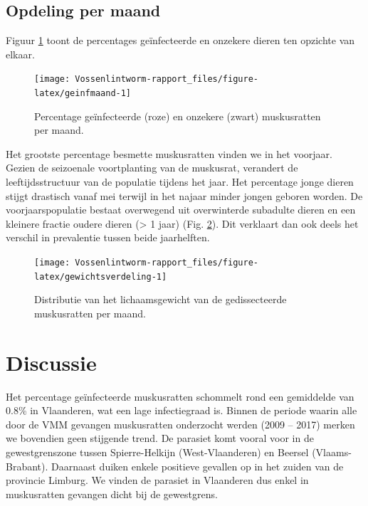 \documentclass[twoside]{extreport}
\begin{document}
\section{Opdeling per maand}\label{opdeling-per-maand}

Figuur \ref{fig:geinfmaand} toont de percentages geïnfecteerde en
onzekere dieren ten opzichte van elkaar.

\begin{figure}

{\centering \texttt{[image: Vossenlintworm-rapport\_files/figure-latex/geinfmaand-1]} 

}

\caption{Percentage geïnfecteerde (roze) en onzekere (zwart) muskusratten per maand.}\label{fig:geinfmaand}
\end{figure}

Het grootste percentage besmette muskusratten vinden we in het voorjaar.
Gezien de seizoenale voortplanting van de muskusrat, verandert de
leeftijdsstructuur van de populatie tijdens het jaar. Het percentage
jonge dieren stijgt drastisch vanaf mei terwijl in het najaar minder
jongen geboren worden. De voorjaarspopulatie bestaat overwegend uit
overwinterde subadulte dieren en een kleinere fractie oudere dieren
(\textgreater{} 1 jaar) (Fig. \ref{fig:gewichtsverdeling}). Dit
verklaart dan ook deels het verschil in prevalentie tussen beide
jaarhelften.

\begin{figure}

{\centering \texttt{[image: Vossenlintworm-rapport\_files/figure-latex/gewichtsverdeling-1]} 

}

\caption{Distributie van het lichaamsgewicht van de gedissecteerde muskusratten per maand.}\label{fig:gewichtsverdeling}
\end{figure}

\chapter{Discussie}\label{discussie}

Het percentage geïnfecteerde muskusratten schommelt rond een gemiddelde
van 0.8\% in Vlaanderen, wat een lage infectiegraad is. Binnen de
periode waarin alle door de VMM gevangen muskusratten onderzocht werden
(2009 -- 2017) merken we bovendien geen stijgende trend. De parasiet
komt vooral voor in de gewestgrenszone tussen Spierre-Helkijn
(West-Vlaanderen) en Beersel (Vlaams-Brabant). Daarnaast duiken enkele
positieve gevallen op in het zuiden van de provincie Limburg. We vinden
de parasiet in Vlaanderen dus enkel in muskusratten gevangen dicht bij
de gewestgrens.
\end{document}
